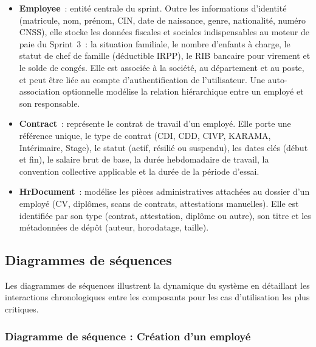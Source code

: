 \begin{itemize}
    \item \textbf{Employee}~: entité centrale du sprint.
          Outre les informations d'identité (matricule, nom, prénom, CIN,
          date de naissance, genre, nationalité, numéro CNSS), elle stocke
          les données fiscales et sociales indispensables au moteur de paie
          du Sprint~3~: la situation familiale, le nombre d'enfants à charge,
          le statut de chef de famille (déductible IRPP), le RIB bancaire
          pour virement et le solde de congés. Elle est associée à la société,
          au département et au poste, et peut être liée au compte
          d'authentification de l'utilisateur. Une auto-association
          optionnelle modélise la relation hiérarchique entre un employé
          et son responsable.

    \item \textbf{Contract}~: représente le contrat de travail d'un employé.
          Elle porte une référence unique, le type de contrat (CDI, CDD,
          CIVP, KARAMA, Intérimaire, Stage), le statut (actif, résilié
          ou suspendu), les dates clés (début et fin), le salaire brut
          de base, la durée hebdomadaire de travail, la convention
          collective applicable et la durée de la période d'essai.

    \item \textbf{HrDocument}~: modélise les pièces administratives attachées
          au dossier d'un employé (CV, diplômes, scans de contrats,
          attestations manuelles). Elle est identifiée par son type
          (contrat, attestation, diplôme ou autre), son titre et les
          métadonnées de dépôt (auteur, horodatage, taille).
\end{itemize}
\subsection{Diagrammes de séquences}

Les diagrammes de séquences illustrent la dynamique du système en
détaillant les interactions chronologiques entre les composants pour
les cas d'utilisation les plus critiques.

\subsubsection{Diagramme de séquence : Création d'un employé}

